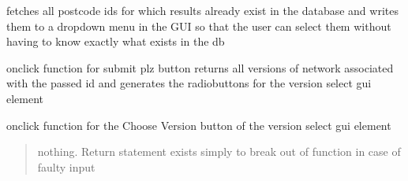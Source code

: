 \documentclass[letterpaper,10pt,english]{sphinxmanual}
\begin{document}
\begin{fulllineitems}
\label{\detokenize{docs_gui/js_api/postcode_editor/display_postcode:createPLZIDDropdown}}
\pysigstartsignatures
{}
\pysigstopsignatures
\sphinxAtStartPar
fetches all postcode ids for which results already exist in the database and writes them to a dropdown menu in the GUI
so that the user can select them without having to know exactly what exists in the db

\end{fulllineitems}


\begin{fulllineitems}
\label{\detokenize{docs_gui/js_api/postcode_editor/display_postcode:selectVersionOfPostalCodeNetwork}}
\pysigstartsignatures
{}
\pysigstopsignatures
\sphinxAtStartPar
onclick function for submit plz button
returns all versions of network associated with the passed id and generates the radiobuttons for the version select gui element

\end{fulllineitems}


\begin{fulllineitems}
\label{\detokenize{docs_gui/js_api/postcode_editor/display_postcode:chooseVersionOfPlzNetwork}}
\pysigstartsignatures
{}
\pysigstopsignatures
\sphinxAtStartPar
onclick function for the Choose Version button of the version select gui element
\begin{quote}\begin{description}
\sphinxAtStartPar
nothing. Return statement exists simply to break out of function in case of faulty input

\end{description}\end{quote}

\end{fulllineitems}
\end{document}
